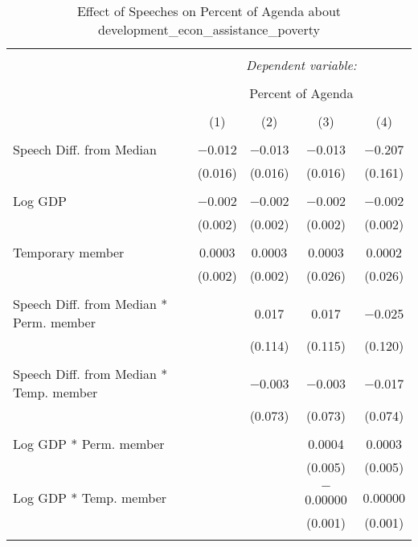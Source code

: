 
\begin{table}[!htbp] \centering 
  \caption{Effect of Speeches on Percent of Agenda about development_econ_assistance_poverty} 
  \label{} 
\begin{tabular}{@{\extracolsep{5pt}}lcccc} 
\\[-1.8ex]\hline 
\hline \\[-1.8ex] 
 & \multicolumn{4}{c}{\textit{Dependent variable:}} \\ 
\cline{2-5} 
\\[-1.8ex] & \multicolumn{4}{c}{Percent of Agenda} \\ 
\\[-1.8ex] & (1) & (2) & (3) & (4)\\ 
\hline \\[-1.8ex] 
 Speech Diff. from Median & $-$0.012 & $-$0.013 & $-$0.013 & $-$0.207 \\ 
  & (0.016) & (0.016) & (0.016) & (0.161) \\ 
  & & & & \\ 
 Log GDP & $-$0.002 & $-$0.002 & $-$0.002 & $-$0.002 \\ 
  & (0.002) & (0.002) & (0.002) & (0.002) \\ 
  & & & & \\ 
 Temporary member & 0.0003 & 0.0003 & 0.0003 & 0.0002 \\ 
  & (0.002) & (0.002) & (0.026) & (0.026) \\ 
  & & & & \\ 
 Speech Diff. from Median * Perm. member &  & 0.017 & 0.017 & $-$0.025 \\ 
  &  & (0.114) & (0.115) & (0.120) \\ 
  & & & & \\ 
 Speech Diff. from Median * Temp. member &  & $-$0.003 & $-$0.003 & $-$0.017 \\ 
  &  & (0.073) & (0.073) & (0.074) \\ 
  & & & & \\ 
 Log GDP * Perm. member &  &  & 0.0004 & 0.0003 \\ 
  &  &  & (0.005) & (0.005) \\ 
  & & & & \\ 
 Log GDP * Temp. member &  &  & $-$0.00000 & 0.00000 \\ 
  &  &  & (0.001) & (0.001) \\ 
  & & & & \\ 

\end{tabular}
\end{table}
